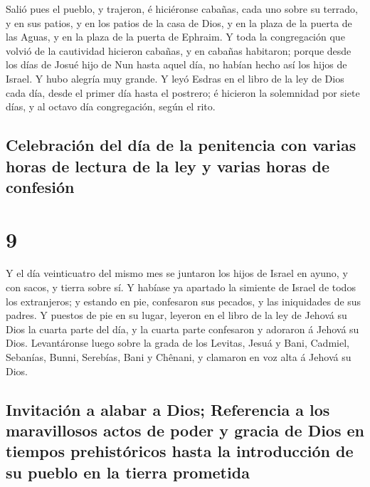  Salió pues el pueblo, y trajeron, é hiciéronse cabañas,
cada uno sobre su terrado, y en sus patios, y en los patios de la casa
de Dios, y en la plaza de la puerta de las Aguas, y en la plaza de la
puerta de Ephraim.  Y toda la congregación que volvió de
la cautividad hicieron cabañas, y en cabañas habitaron; porque desde los
días de Josué hijo de Nun hasta aquel día, no habían hecho así los hijos
de Israel. Y hubo alegría muy grande.  Y leyó Esdras en
el libro de la ley de Dios cada día, desde el primer día hasta el
postrero; é hicieron la solemnidad por siete días, y al octavo día
congregación, según el rito.

\hypertarget{celebraciuxf3n-del-duxeda-de-la-penitencia-con-varias-horas-de-lectura-de-la-ley-y-varias-horas-de-confesiuxf3n}{%
\subsection{Celebración del día de la penitencia con varias horas de
lectura de la ley y varias horas de
confesión}\label{celebraciuxf3n-del-duxeda-de-la-penitencia-con-varias-horas-de-lectura-de-la-ley-y-varias-horas-de-confesiuxf3n}}

\hypertarget{section-16-9}{%
\section{9}\label{section-16-9}}

 Y el día veinticuatro del mismo mes se juntaron los hijos
de Israel en ayuno, y con sacos, y tierra sobre sí.  Y
habíase ya apartado la simiente de Israel de todos los extranjeros; y
estando en pie, confesaron sus pecados, y las iniquidades de sus padres.
 Y puestos de pie en su lugar, leyeron en el libro de la
ley de Jehová su Dios la cuarta parte del día, y la cuarta parte
confesaron y adoraron á Jehová su Dios.  Levantáronse
luego sobre la grada de los Levitas, Jesuá y Bani, Cadmiel, Sebanías,
Bunni, Serebías, Bani y Chênani, y clamaron en voz alta á Jehová su
Dios.

\hypertarget{invitaciuxf3n-a-alabar-a-dios-referencia-a-los-maravillosos-actos-de-poder-y-gracia-de-dios-en-tiempos-prehistuxf3ricos-hasta-la-introducciuxf3n-de-su-pueblo-en-la-tierra-prometida}{%
\subsection{Invitación a alabar a Dios; Referencia a los maravillosos
actos de poder y gracia de Dios en tiempos prehistóricos hasta la
introducción de su pueblo en la tierra
prometida}\label{invitaciuxf3n-a-alabar-a-dios-referencia-a-los-maravillosos-actos-de-poder-y-gracia-de-dios-en-tiempos-prehistuxf3ricos-hasta-la-introducciuxf3n-de-su-pueblo-en-la-tierra-prometida}}

